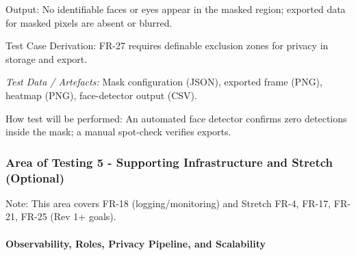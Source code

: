 \documentclass[12pt, titlepage]{article}
\begin{document}
\begin{enumerate}
Output: No identifiable faces or eyes appear in the masked region; exported data for masked pixels are absent or blurred.

Test Case Derivation: FR-27 requires definable exclusion zones for privacy in storage and export.

\textit{Test Data / Artefacts:} Mask configuration (JSON), exported frame (PNG), heatmap (PNG), face-detector output (CSV).

How test will be performed: An automated face detector confirms zero detections inside the mask; a manual spot-check verifies exports.

\end{enumerate}


\subsubsection{Area of Testing 5 - Supporting Infrastructure and Stretch (Optional)}

Note: This area covers FR-18 (logging/monitoring) and Stretch FR-4, FR-17, FR-21, FR-25 (Rev 1+ goals).

\paragraph{Observability, Roles, Privacy Pipeline, and Scalability}
\end{document}
